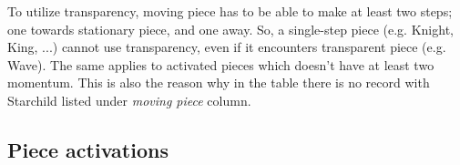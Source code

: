 To utilize transparency, moving piece has to be able to make at least two steps;
one towards stationary piece, and one away. So, a single-step piece (e.g. Knight,
King, ...) cannot use transparency, even if it encounters transparent piece (e.g.
Wave). The same applies to activated pieces which doesn't have at least two momentum.
This is also the reason why in the table there is no record with Starchild listed
under \emph{moving piece} column.

\clearpage %

\subsection*{Piece activations}
\label{sec:Appendix/Summary/Piece activations}

